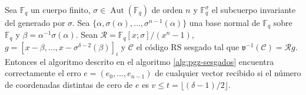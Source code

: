 \begin{theorem}
  Sea \(\mathbb F_q\) un cuerpo finito, \(\sigma \in \operatorname{Aut}(\mathbb F_q)\) de orden \(n\) y \(\mathbb F_q^{\sigma}\) el subcuerpo invariante del generado por \(\sigma\).
  Sea \(\{\alpha, \sigma(\alpha), \dots, \sigma^{n-1}(\alpha)\}\) una base normal de \(\mathbb F_q\) sobre \(\mathbb F_{q}\) y \(\beta = \alpha^{-1}\sigma(\alpha)\).
  Sean \(\mathcal R = \mathbb F_q[x; \sigma]/(x^n - 1)\), \(g = \left[x - \beta, \dots, x - \sigma^{\delta - 2}(\beta)\right]_{i}\) y \(\mathcal C\) el código RS sesgado tal que \(\mathfrak v^{-1}(\mathcal C) = \mathcal Rg\).
  Entonces el algoritmo descrito en el algoritmo \ref{alg:pgz-sesgados} encuentra correctamente el erro \(e = (e_0, \dots, e_{n-1})\) de cualquier vector recibido si el número de coordenadas distintas de cero de \(e\) es \(v \leq t = \lfloor (\delta - 1)/2 \rfloor\).
\end{theorem}

